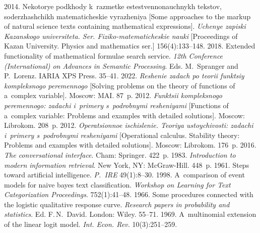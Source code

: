 \begin{multicols}{2}
{{\begin{thebibliography}{99}
 2014. Ne\-ko\-to\-rye pod\-kho\-dy k~raz\-met\-ke 
estest\-ven\-no\-na\-uch\-nykh teks\-tov, so\-der\-zha\-shchikh ma\-te\-ma\-ti\-che\-skie vy\-ra\-zhe\-niya [Some approaches to the 
markup of natural science texts containing mathematical expressions]. \textit{Uchenye zapiski 
Kazanskogo universiteta. Ser. Fiziko-matematicheskie nauki} [Proceedings of Kazan University. Physics 
and mathematics ser.] 156(4):133--148.
 2018. Extended functionality of 
mathematical formulae search service. \textit{12th Conference (International) on Advances in Semantic 
Processing}. Eds. M.~Spranger and P.~Lorenz. IARIA XPS Press. 35--41.
 2022. \textit{Reshenie zadach po teorii funktsiy 
kompleksnogo peremennogo} [Solving problems on the theory of functions of a~complex variable]. 
Moscow: MAI. 87~p.
 2012. \textit{Funk\-tsii komp\-leks\-no\-go 
pe\-re\-men\-no\-go: za\-da\-chi i~pri\-me\-ry s~po\-drob\-ny\-mi re\-she\-ni\-yami} [Functions of 
a~complex variable: Problems and examples with detailed solutions]. Moscow: Librokom. 
208~p.
 2012. \textit{Ope\-ra\-tsi\-on\-noe is\-chis\-le\-nie. 
Teo\-riya ustoy\-chi\-vosti: za\-da\-chi i~pri\-me\-ry s~po\-drob\-ny\-mi re\-she\-ni\-yami} [Operational 
calculus. Stability theory: Problems and examples with detailed solutions]. Moscow: 
Librokom. 176~p.
 2016. \textit{The conversational interface}. Cham: Springer. 422~p.
 1983. \textit{Introduction to modern information retrieval}. New 
York, NY: McGraw-Hill. 448~p.
 1961. Steps toward artificial intelligence. \textit{P.~IRE} 49(1):8--30.
 1998. A~comparison of event models for naive bayes text 
classification. \textit{Workshop on Learning 
for Text Categorization Proceedings}. 752(1):41--48.
 1966. Some procedures connected with the logistic qualitative response curve. 
\textit{Research papers in probability and statistics}. Ed. F.\,N.~David. London: Wiley. 55--71.
 1969. A~multinomial extension of the linear logit model. \textit{Int. 
Econ. Rev.} 10(3):251--259.


\end{thebibliography}}}
\end{multicols}
